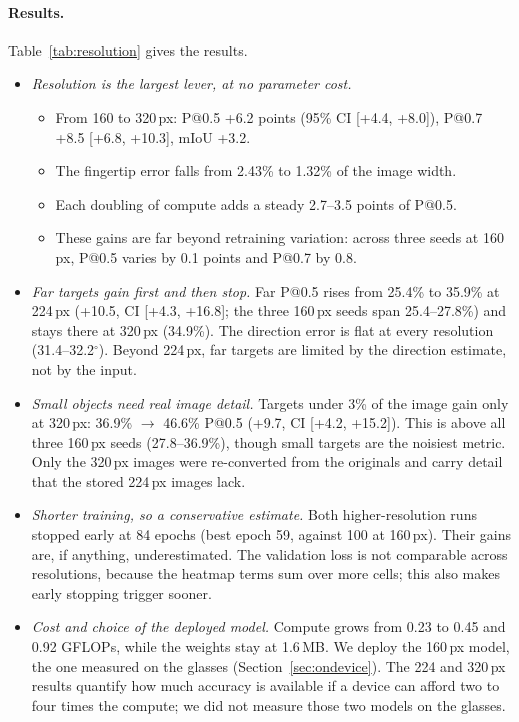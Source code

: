 \paragraph{Results.} Table~\ref{tab:resolution} gives the results.
\begin{itemize}
\item \emph{Resolution is the largest lever, at no parameter cost.}
  \begin{itemize}
  \item From 160 to 320\,px: P@0.5 +6.2 points (95\% CI [+4.4, +8.0]), P@0.7 +8.5 [+6.8, +10.3], mIoU +3.2.
  \item The fingertip error falls from 2.43\% to 1.32\% of the image width.
  \item Each doubling of compute adds a steady 2.7--3.5 points of P@0.5.
  \item These gains are far beyond retraining variation: across three seeds at 160\,px, P@0.5 varies by 0.1 points and P@0.7 by 0.8.
  \end{itemize}
\item \emph{Far targets gain first and then stop.} Far P@0.5 rises from 25.4\% to 35.9\% at 224\,px (+10.5, CI [+4.3, +16.8]; the three 160\,px seeds span 25.4--27.8\%) and stays there at 320\,px (34.9\%). The direction error is flat at every resolution (31.4--32.2$^\circ$). Beyond 224\,px, far targets are limited by the direction estimate, not by the input.
\item \emph{Small objects need real image detail.} Targets under 3\% of the image gain only at 320\,px: 36.9\% $\to$ 46.6\% P@0.5 (+9.7, CI [+4.2, +15.2]). This is above all three 160\,px seeds (27.8--36.9\%), though small targets are the noisiest metric. Only the 320\,px images were re-converted from the originals and carry detail that the stored 224\,px images lack.
\item \emph{Shorter training, so a conservative estimate.} Both higher-resolution runs stopped early at 84 epochs (best epoch 59, against 100 at 160\,px). Their gains are, if anything, underestimated. The validation loss is not comparable across resolutions, because the heatmap terms sum over more cells; this also makes early stopping trigger sooner.
\item \emph{Cost and choice of the deployed model.} Compute grows from 0.23 to 0.45 and 0.92 GFLOPs, while the weights stay at 1.6\,MB. We deploy the 160\,px model, the one measured on the glasses (Section~\ref{sec:ondevice}). The 224 and 320\,px results quantify how much accuracy is available if a device can afford two to four times the compute; we did not measure those two models on the glasses.
\end{itemize}

